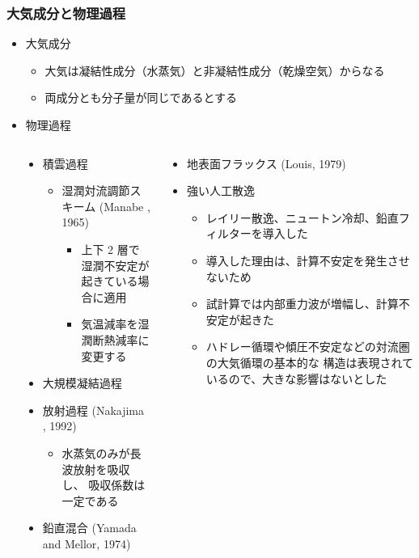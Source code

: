 \documentclass[aspectratio=149,9pt,fleqn]{beamer}
\begin{document}
\begin{frame}
	\frametitle{大気成分と物理過程}
	\begin{itemize}
		\item 大気成分
			\begin{itemize}
				\item 大気は凝結性成分（水蒸気）と非凝結性成分（乾燥空気）からなる
				\item 両成分とも分子量が同じであるとする
			\end{itemize}
		\item 物理過程
	\end{itemize}
	\begin{columns}[onlytextwidth,T]
		\begin{column}{.05\textwidth}
		\end{column}
		\begin{column}{.45\textwidth}
			\begin{itemize}
				\item 積雲過程
					\begin{itemize}
						\item 湿潤対流調節スキーム (Manabe \etal*, 1965)
							\begin{itemize}
								\item 上下 2 層で湿潤不安定が起きている場合に適用
								\item 気温減率を湿潤断熱減率に変更する
							\end{itemize}
					\end{itemize}
				\item 大規模凝結過程
				\item 放射過程 (Nakajima \etal*, 1992)
					\begin{itemize}
						\item 水蒸気のみが長波放射を吸収し、
							吸収係数は一定である
					\end{itemize}
				\item 鉛直混合 (Yamada and Mellor, 1974)
			\end{itemize}
		\end{column}
		\begin{column}{.45\textwidth}
			\begin{itemize}
				\item 地表面フラックス (Louis, 1979)
				\item 強い人工散逸
					\begin{itemize}
						\item レイリー散逸、ニュートン冷却、鉛直フィルターを導入した
						\item 導入した理由は、計算不安定を発生させないため
						\item 試計算では内部重力波が増幅し、計算不安定が起きた
						\item ハドレー循環や傾圧不安定などの対流圏の大気循環の基本的な
							構造は表現されているので、大きな影響はないとした
					\end{itemize}
			\end{itemize}
		\end{column}
	\end{columns}
\end{frame}
\end{document}
